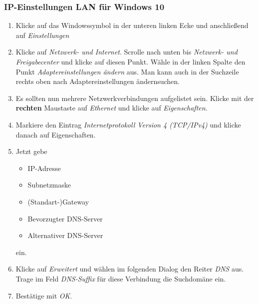 \documentclass[a4paper,12pt]{scrartcl}
\begin{document}
\subsubsection*{IP-Einstellungen LAN für Windows 10}
\begin{minipage}{0.57\textwidth}
\begin{enumerate}
	\item Klicke auf das Windowssymbol in der unteren linken Ecke und anschließend auf \textit{Einstellungen}
	\item Klicke auf \textit{Netzwerk- und Internet}.
	Scrolle nach unten bis \textit{Netzwerk- und Freigabecenter} und klicke auf diesen Punkt. Wähle in der linken Spalte den Punkt \textit{Adaptereinstellungen ändern} aus.
	Man kann auch in der Suchzeile rechts oben nach \glqq Adaptereinstellungen ändern\grqq suchen.
    \item Es sollten nun mehrere Netzwerkverbindungen aufgelistet sein. Klicke mit der \textbf{rechten} Maustaste auf \textit{Ethernet} und klicke auf \textit{Eigenschaften}.
    \item Markiere den Eintrag \textit{Internetprotokoll Version 4 (TCP/IPv4)} und klicke danach auf Eigenschaften.
    \item Jetzt gebe
    \begin{itemize}
    	\item IP-Adresse
    	\item Subnetzmaske
    	\item (Standart-)Gateway
    	\item Bevorzugter DNS-Server
    	\item Alternativer DNS-Server
    \end{itemize}
	ein.
    \item Klicke auf \textit{Erweitert} und wählen im folgenden Dialog den Reiter \textit{DNS} aus. Trage im Feld \textit{DNS-Suffix} für diese Verbindung die Suchdomäne ein.
    \item Bestätige mit \textit{OK}.
\end{enumerate}
\end{minipage}
\hfill
\end{document}
